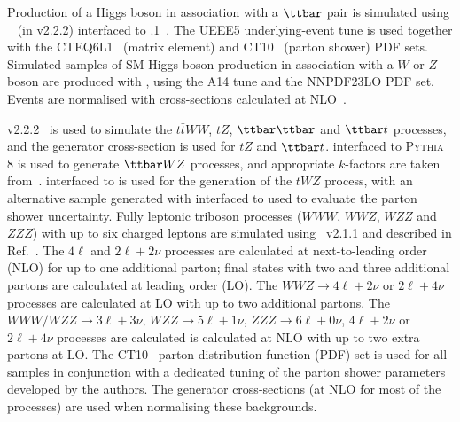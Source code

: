 Production of a Higgs boson in association with a $\ttbar$ pair is simulated using \AMCATNLO~\cite{Alwall:2014hca} 
(in \MADGRAPH v2.2.2) interfaced to .1~\cite{Corcella:2000bw}.  
The UEEE5 underlying-event tune is used together with the CTEQ6L1~\cite{Pumplin:2002vw} (matrix element) and CT10~\cite{Lai:2010vv} (parton shower) PDF sets.
Simulated samples of SM Higgs boson production in association with a $W$ or $Z$ boson are produced with , using the \textsc{A14} tune and the \textsc{NNPDF23LO} PDF set. Events are normalised with cross-sections calculated at NLO~\cite{Dittmaier:2012vm}.

\MADGRAPH v2.2.2~\cite{Alwall:2011uj} is used to simulate the $t\bar{t}WW$, $tZ$, $\ttbar\ttbar$ and $\ttbar t$ processes, and the generator cross-section is used for $tZ$ and $\ttbar t$. \MADGRAPH interfaced to \textsc{Pythia} 8 is used to generate $\ttbar WZ$ processes, and appropriate $k$-factors are taken from~\cite{Alwall:2014hca}. \AMCATNLO interfaced to  is used for the generation of the $tWZ$ process, with an alternative sample generated with \AMCATNLO interfaced to \HERWIG used to evaluate the parton shower uncertainty.  
Fully leptonic triboson processes ($WWW$, $WWZ$, $WZZ$ and $ZZZ$) with up to six charged leptons are simulated using \SHERPA~v2.1.1 
and described in Ref.~\cite{ATL-PHYS-PUB-2016-002}. 
The $4\ell$ and $2\ell+2\nu$ processes are calculated at next-to-leading order (NLO) for up to one additional parton; 
final states with two and three additional partons are calculated at leading order (LO). 
The $WWZ\to 4\ell+2\nu$ or $2\ell+4\nu$ processes are calculated at LO with up to two additional partons. 
The $WWW/WZZ\to 3\ell+3\nu$, $WZZ\to 5\ell+1\nu$, $ZZZ\to 6\ell+0\nu$, $4\ell+2\nu$ or $2\ell+4\nu$ processes 
are calculated is calculated at NLO with up to two extra partons at LO. 
The CT10~\cite{Lai:2010vv} parton distribution function (PDF) set is used for all \SHERPA samples in conjunction with 
a dedicated tuning of the parton shower parameters developed by the \SHERPA authors. 
The generator cross-sections (at NLO for most of the processes) are used when normalising these backgrounds.

